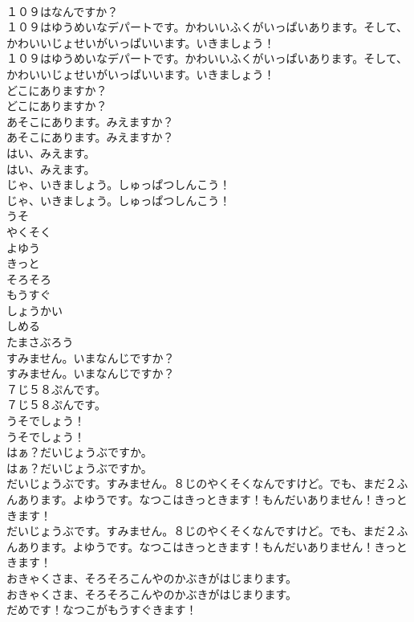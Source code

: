 \documentclass[8pt]{extreport}
\begin{document}
\begin{CJK}{UTF8}{min}
\\	１０９はなんですか？ 
\\	１０９はゆうめいなデパートです。かわいいふくがいっぱいあります。そして、かわいいじょせいがいっぱいいます。いきましょう！	
\\	１０９はゆうめいなデパートです。かわいいふくがいっぱいあります。そして、かわいいじょせいがいっぱいいます。いきましょう！ 
\\	どこにありますか？	
\\	どこにありますか？ 
\\	あそこにあります。みえますか？	
\\	あそこにあります。みえますか？ 
\\	はい、みえます。	
\\	はい、みえます。 
\\	じゃ、いきましょう。しゅっぱつしんこう！	
\\	じゃ、いきましょう。しゅっぱつしんこう！ 
\\	うそ
\\	やくそく
\\	よゆう
\\	きっと
\\	そろそろ
\\	もうすぐ
\\	しょうかい
\\	しめる
\\	たまさぶろう
\\	すみません。いまなんじですか？	
\\	すみません。いまなんじですか？ 
\\	７じ５８ぷんです。	
\\	７じ５８ぷんです。 
\\	うそでしょう！	
\\	うそでしょう！ 
\\	はぁ？だいじょうぶですか。	
\\	はぁ？だいじょうぶですか。 
\\	だいじょうぶです。すみません。８じのやくそくなんですけど。でも、まだ２ふんあります。よゆうです。なつこはきっときます！もんだいありません！きっときます！	
\\	だいじょうぶです。すみません。８じのやくそくなんですけど。でも、まだ２ふんあります。よゆうです。なつこはきっときます！もんだいありません！きっときます！ 
\\	おきゃくさま、そろそろこんやのかぶきがはじまります。	
\\	おきゃくさま、そろそろこんやのかぶきがはじまります。 
\\	だめです！なつこがもうすぐきます！	

\end{CJK}
\end{document}
